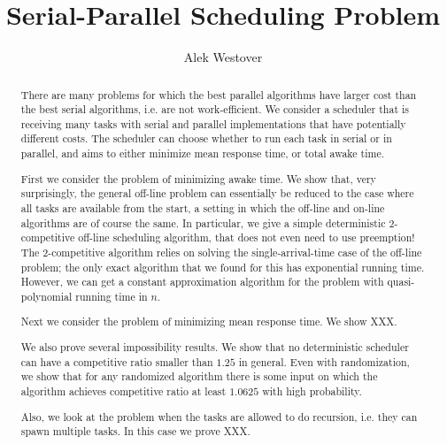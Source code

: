 \documentclass[twocolumn]{article}[10pt]
\author{Alek Westover}
\title{Serial-Parallel Scheduling Problem}
\newcommand{\todo}[1]{{\color{red}\textbf{TODO:} #1}}
\begin{document}
\maketitle

\begin{abstract}
There are many problems for which the best parallel algorithms
have larger cost than the best serial algorithms, i.e. are not
work-efficient. We consider a scheduler that is receiving many
tasks with serial and parallel implementations that have
potentially different costs. The scheduler can choose whether to
run each task in serial or in parallel, and aims to either
minimize mean response time, or total awake time. 

First we consider the problem of minimizing awake time. We show
that, very surprisingly, the general off-line problem can
essentially be reduced to the case where all tasks are available
from the start, a setting in which the off-line and on-line
algorithms are of course the same. In particular, we give a
simple deterministic $2$-competitive off-line scheduling
algorithm, that does not even need to use preemption! 
The $2$-competitive algorithm relies on solving the
single-arrival-time case of the off-line problem; the only exact
algorithm that we found for this has exponential running time.
However, we can get a constant approximation algorithm for the
problem with quasi-polynomial running time in $n$.

Next we consider the problem of minimizing mean response time.
We show XXX.

We also prove several impossibility results.
We show that no deterministic scheduler can have a
competitive ratio smaller than $1.25$ in general.
Even with randomization, we show that for any randomized
algorithm there is some input on which the algorithm achieves
competitive ratio at least $1.0625$ with high probability.

Also, we look at the problem when the tasks are allowed to do
recursion, i.e. they can spawn multiple tasks. In this case we
prove XXX.
\end{abstract}










\end{document}

